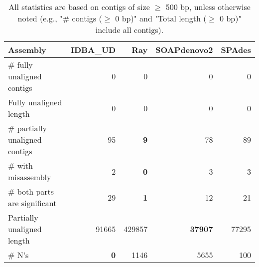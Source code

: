 \documentclass[12pt,a4paper]{article}
\begin{document}
\begin{table}[ht]
\begin{center}
\caption{All statistics are based on contigs of size $\geq$ 500 bp, unless otherwise noted (e.g., "\# contigs ($\geq$ 0 bp)" and "Total length ($\geq$ 0 bp)" include all contigs).}
\begin{tabular}{|l*{4}{|r}|}
\hline
Assembly & IDBA\_UD & Ray & SOAPdenovo2 & SPAdes \\ \hline
\# fully unaligned contigs & 0 & 0 & 0 & 0 \\ \hline
Fully unaligned length & 0 & 0 & 0 & 0 \\ \hline
\# partially unaligned contigs & 95 & {\bf 9} & 78 & 89 \\ \hline
\hspace{5mm}\# with misassembly & 2 & {\bf 0} & 3 & 3 \\ \hline
\hspace{5mm}\# both parts are significant & 29 & {\bf 1} & 12 & 21 \\ \hline
Partially unaligned length & 91665 & 429857 & {\bf 37907} & 77295 \\ \hline
\# N's & {\bf 0} & 1146 & 5655 & 100 \\ \hline
\end{tabular}
\end{center}
\end{table}
\end{document}
